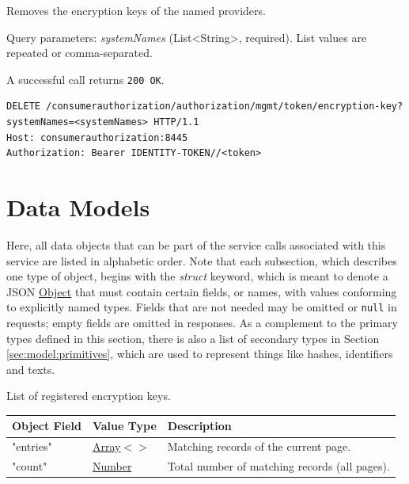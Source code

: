 \documentclass[a4paper]{arrowhead}
\newcommand{\fparam}[1]{\textit{\textcolor{ArrowheadBlue}{#1}}}
\newcommand{\mref}[2][]{{\textcolor{ArrowheadPurple}{\hyperref[sec:model:#2]{\ifstrempty{#1}{#2}{#1}}}}}
\newcommand{\oref}[1]{{\textcolor{ArrowheadBlue}{\hyperref[sec:operations:#1]{#1}}}}
\newcommand{\pref}[1]{{\textcolor{ArrowheadGrey}{\hyperref[sec:model:primitives:#1]{#1}}}}
\begin{document}
Removes the encryption keys of the named providers.

Query parameters: \fparam{systemNames} (List\textless{}String\textgreater{}, required). List values are repeated or comma-separated.

A successful call returns \texttt{200 OK}.

\begin{lstlisting}[label={lst:remove-encryption-keys},caption={An \oref{remove-encryption-keys} invocation.}]
DELETE /consumerauthorization/authorization/mgmt/token/encryption-key?systemNames=<systemNames> HTTP/1.1
Host: consumerauthorization:8445
Authorization: Bearer IDENTITY-TOKEN//<token>
\end{lstlisting}

\newpage

\section{Data Models}
\label{sec:model}

Here, all data objects that can be part of the service calls associated with this service are listed in alphabetic order.
Note that each subsection, which describes one type of object, begins with the \textit{struct} keyword, which is meant to denote a JSON \pref{Object} that must contain certain fields, or names, with values conforming to explicitly named types.
Fields that are not needed may be omitted or \texttt{null} in requests; empty fields are omitted in responses.
As a complement to the primary types defined in this section, there is also a list of secondary types in Section \ref{sec:model:primitives}, which are used to represent things like hashes, identifiers and texts.


List of registered encryption keys.


\noindent\begin{tabularx}{\textwidth}{| >{\raggedright\arraybackslash}p{3.9cm} | >{\raggedright\arraybackslash\small}p{5.3cm} | X |} \hline
\rowcolor{gray!33} Object Field & Value Type & Description \\ \hline
"entries" & \pref{Array}$<$\allowbreak{}\mref[Authorization\allowbreak{}Mgmt\allowbreak{}Encryption\allowbreak{}Key\allowbreak{}Response]{AuthorizationMgmtEncryptionKeyResponse}$>$ & Matching records of the current page. \\ \hline
"count" & \pref{Number} & Total number of matching records (all pages). \\ \hline
\end{tabularx}
\end{document}
